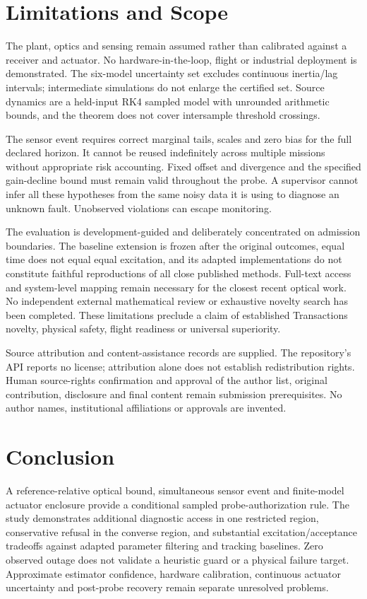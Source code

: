 \section{Limitations and Scope}
The plant, optics and sensing remain assumed rather than calibrated against a receiver and actuator. No hardware-in-the-loop, flight or industrial deployment is demonstrated. The six-model uncertainty set excludes continuous inertia/lag intervals; intermediate simulations do not enlarge the certified set. Source dynamics are a held-input RK4 sampled model with unrounded arithmetic bounds, and the theorem does not cover intersample threshold crossings.

The sensor event requires correct marginal tails, scales and zero bias for the full declared horizon. It cannot be reused indefinitely across multiple missions without appropriate risk accounting. Fixed offset and divergence and the specified gain-decline bound must remain valid throughout the probe. A supervisor cannot infer all these hypotheses from the same noisy data it is using to diagnose an unknown fault. Unobserved violations can escape monitoring.

The evaluation is development-guided and deliberately concentrated on admission boundaries. The baseline extension is frozen after the original outcomes, equal time does not equal equal excitation, and its adapted implementations do not constitute faithful reproductions of all close published methods. Full-text access and system-level mapping remain necessary for the closest recent optical work. No independent external mathematical review or exhaustive novelty search has been completed. These limitations preclude a claim of established Transactions novelty, physical safety, flight readiness or universal superiority.

Source attribution and content-assistance records are supplied. The repository's API reports no license; attribution alone does not establish redistribution rights. Human source-rights confirmation and approval of the author list, original contribution, disclosure and final content remain submission prerequisites. No author names, institutional affiliations or approvals are invented.

\section{Conclusion}
A reference-relative optical bound, simultaneous sensor event and finite-model actuator enclosure provide a conditional sampled probe-authorization rule. The study demonstrates additional diagnostic access in one restricted region, conservative refusal in the converse region, and substantial excitation/acceptance tradeoffs against adapted parameter filtering and tracking baselines. Zero observed outage does not validate a heuristic guard or a physical failure target. Approximate estimator confidence, hardware calibration, continuous actuator uncertainty and post-probe recovery remain separate unresolved problems.

